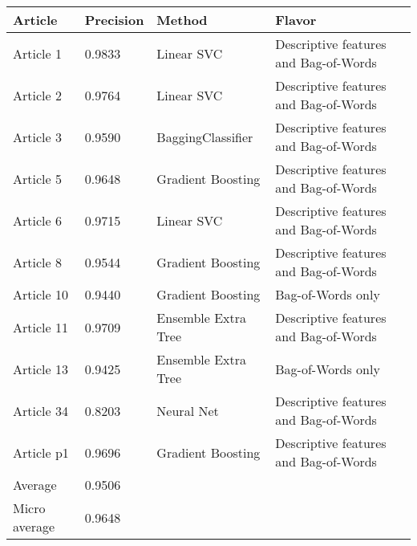 \begin{tabular}{|l|l|l|l| }
\hline
Article & Precision & Method & Flavor \\ \hline
Article 1 & 0.9833 & Linear SVC & Descriptive features and Bag-of-Words\\
Article 2 & 0.9764 & Linear SVC & Descriptive features and Bag-of-Words\\
Article 3 & 0.9590 & BaggingClassifier & Descriptive features and Bag-of-Words\\
Article 5 & 0.9648 & Gradient Boosting & Descriptive features and Bag-of-Words\\
Article 6 & 0.9715 & Linear SVC & Descriptive features and Bag-of-Words\\
Article 8 & 0.9544 & Gradient Boosting & Descriptive features and Bag-of-Words\\
Article 10 & 0.9440 & Gradient Boosting & Bag-of-Words only\\
Article 11 & 0.9709 & Ensemble Extra Tree & Descriptive features and Bag-of-Words\\
Article 13 & 0.9425 & Ensemble Extra Tree & Bag-of-Words only\\
Article 34 & 0.8203 & Neural Net & Descriptive features and Bag-of-Words\\
Article p1 & 0.9696 & Gradient Boosting & Descriptive features and Bag-of-Words\\
Average & 0.9506 & & \\
Micro average & 0.9648 & & \\
\hline
\end{tabular}